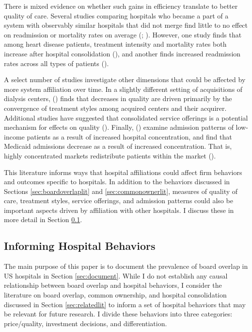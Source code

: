 \documentclass[12pt]{article}
\begin{document}
    There is mixed evidence on whether such gains in efficiency translate to better quality of care.  Several studies comparing hospitals who became a part of a system with observably similar hospitals that did not merge find little to no effect on readmission or mortality rates on average (\cite{haas2011mergers}; \cite{beaulieu2020changes}). However, one study finds that among heart disease patients, treatment intensity and mortality rates both increase after hospital consolidation (\cite{hayford2012impact}), and another finds increased readmission rates across all types of patients (\cite{andreyeva2024corporatization}). 

    A select number of studies investigate other dimensions that could be affected by more system affiliation over time. In a slightly different setting of acquisitions of dialysis centers, \citeauthor{eliason2020acquisitions} (\citeyear{eliason2020acquisitions}) finds that decreases in quality are driven primarily by the convergence of treatment styles among acquired centers and their acquirer. Additional studies have suggested that consolidated service offerings is a potential mechanism for effects on quality (\cite{mariani2022impact}). Finally, \citeauthor{desai2023hospital} (\citeyear{desai2023hospital}) examine admission patterns of low-income patients as a result of increased hospital concentration, and find that Medicaid admissions decrease as a result of increased concentration. That is, highly concentrated markets redistribute patients within the market (\cite{desai2023hospital}). 

    This literature informs ways that hospital affiliations could affect firm behaviors and outcomes specific to hospitals. In addition to the behaviors discussed in Sections \ref{sec:boardoverlaplit} and \ref{sec:commonownerlit}, measures of quality of care, treatment styles, service offerings, and admission patterns could also be important aspects driven by affiliation with other hospitals. I discuss these in more detail in Section \ref{sec:hospbehaviors}. 

    

    \subsection{Informing Hospital Behaviors}\label{sec:hospbehaviors}

    The main purpose of this paper is to document the prevalence of board overlap in US hospitals in Section \ref{sec:document}. While I do not establish any causal relationship between board overlap and hospital behaviors, I consider the literature on board overlap, common ownership, and hospital consolidation discussed in Section \ref{sec:relatedlit} to inform a set of hospital behaviors that may be relevant for future research. I divide these behaviors into three categories: price/quality, investment decisions, and differentiation. 
\end{document}
